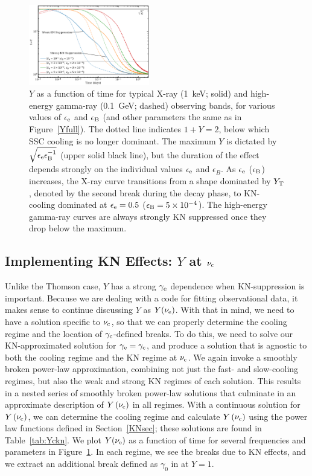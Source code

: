 \documentclass[fleqn,usenatbib]{mnras}
\begin{document}
\begin{figure}
    \centering
    \includegraphics[width=0.47\textwidth]{images/ytplot.png}
    \caption{$Y$ as a function of time for typical X-ray (1~keV; solid) and high-energy gamma-ray (0.1~GeV; dashed) observing bands, for various values of $\epsilon_{\rm e}$ and $\epsilon_{\rm B}$ (and other parameters the same as in Figure~\ref{Yfull}). The dotted line indicates $1+Y=2$, below which SSC cooling is no longer dominant. The maximum $Y$ is dictated by $\sqrt{\epsilon_{\rm e}\epsilon_{\rm B}^{-1}}$ (upper solid black line), but the duration of the effect depends strongly on the individual values $\epsilon_{\rm e}$ and $\epsilon_{B}$. As $\epsilon_{\rm e}$ ($\epsilon_{\rm B}$) increases, the X-ray curve transitions from a shape dominated by $Y_{\rm T}$, denoted by the second break during the decay phase, to KN-cooling dominated at $\epsilon_{\rm e}=0.5$ ($\epsilon_{\rm B}=5\times 10^{-4}$). The high-energy gamma-ray curves are always strongly KN suppressed once they drop below the maximum.} 
    \label{KNfreq}
\end{figure}


\subsection{Implementing KN Effects: $Y$ at $\nu_{\rm c}$}

Unlike the Thomson case, $Y$ has a strong $\gamma_{\rm e}$ dependence when KN-suppression is important. Because we are dealing with a code for fitting observational data, it makes sense to continue discussing $Y$ as $Y(\nu_{\rm e})$. With that in mind, we need to have a solution specific to $\nu_{\rm c}$, so that we can properly determine the cooling regime and the location of $\gamma_{\rm c}$-defined breaks. To do this, we need to solve our KN-approximated solution for $\gamma_{\rm e}=\gamma_{\rm c}$, and produce a solution that is agnostic to both the cooling regime and the KN regime at $\nu_{\rm c}$. We again invoke a smoothly broken power-law approximation, combining not just the fast- and slow-cooling regimes, but also the weak and strong KN regimes of each solution. This results in a nested series of smoothly broken power-law solutions that culminate in an approximate description of $Y\left(\nu_{\rm c}\right)$ in all regimes. With a continuous solution for $Y\left(\nu_{\rm c}\right)$, we can determine the cooling regime and calculate $Y\left(\nu_{\rm c}\right)$ using the power law functions defined in Section~\ref{KNsec}; these solutions are found in Table~\ref{tab:Yckn}. We plot $Y(\nu_{\rm e})$ as a function of time for several frequencies and parameters in Figure~\ref{KNfreq}. In each regime, we see the breaks due to KN effects, and we extract an additional break defined as $\gamma_0$ in \citet{Nakar} at $Y=1$.
\end{document}
